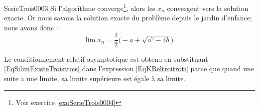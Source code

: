 \begin{corrige}{SerieTrois0003}
	Si l'algorithme converge\footnote{Voir exercice \ref{exoSerieTrois0004}}, alors les $x_n$ convergent vers la solution exacte. Or nous savons la solution exacte du problème depuis le jardin d'enfance; nous avons donc :
	\begin{equation}		\label{EqSilimExisteTroistrois}
		\lim x_n=\frac{ 1 }{2}\big( -a+\sqrt{a^2-4b} \big).
	\end{equation}
	
	Le conditionnement relatif asymptotique est obtenu en substituant \eqref{EqSilimExisteTroistrois} dans l'expression \eqref{EqKReltroitroti} parce que quand une suite a une limite, sa limite supérieure est égale à sa limite.

\end{corrige}
